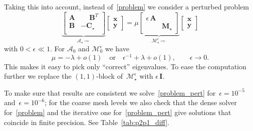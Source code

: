 \documentclass[12pt]{article}
\newcommand{\vect}[1]{\boldsymbol{\mathbf{#1}}}
\begin{document}
Taking this into account, instead of~\eqref{problem} we consider a perturbed\footnotemark{} problem
\begin{equation}\label{problem_pert}
	\underbrace{\begin{bmatrix}
		\vect A & \phantom{-}\vect B^T \\
		\vect B & -\vect C_\star \\
		\end{bmatrix}}_{\mathcal A_\star \coloneqq}
	\begin{bmatrix}
	\vect x \\
	\vect y
	\end{bmatrix}
	=
	\mu
	\underbrace{\begin{bmatrix}
		\epsilon\,\vect A & \\
		& \vect M_\star
		\end{bmatrix}}_{\mathcal M^\epsilon_\star \coloneqq}
	\begin{bmatrix}
	\vect x \\
	\vect y
	\end{bmatrix}
\end{equation}
with $0 < \epsilon \ll 1$. For $\mathcal A_0$ and $\mathcal M^\epsilon_0$ we have
\begin{equation}
	\mu = -\lambda + o(1)\quad\text{or}\quad\epsilon^{-1} + \lambda + o(1),\qquad\epsilon \rightarrow 0.
\end{equation}
This makes it easy to pick only ``correct'' eigenvalues. To ease the computation further we replace the $(1, 1)$-block of~$\mathcal M^\epsilon_\star$ with $\epsilon\,\vect I$. 

To make sure that results are consistent we solve~\eqref{problem_pert} for~$\epsilon = 10^{-5}$ and~$\epsilon = 10^{-6}$; for the coarse mesh levels we also check that the dense solver for~\eqref{problem} and the iterative one for~\eqref{problem_pert} give solutions that coincide in finite precision. See Table~\ref{tab:p2p1_diff}.
\end{document}
